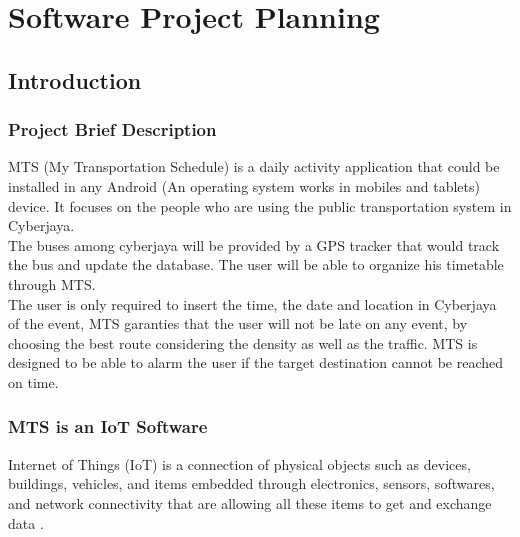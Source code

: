\chapter{Software Project Planning} 

\label{Chapter1} 


\doublespacing


\section{Introduction}

\subsection{Project Brief Description}
MTS (My Transportation Schedule) is a daily activity application that could be installed in any Android (An operating system works in mobiles and tablets) device. It focuses on the people who are using the public transportation system in Cyberjaya.\\

The buses among cyberjaya will be provided by a GPS tracker that would track the bus and update the database. The user will be able to organize his timetable through MTS.\\ 

The user is only required to insert the time, the date and location in Cyberjaya of the event, MTS garanties that the user will not be late on any event, by choosing the best route considering the density as well as the traffic. MTS is designed to be able to alarm the user if the target destination cannot be reached on time.

\subsection{MTS is an IoT Software}
Internet of Things (IoT) is a connection of physical objects such as devices, buildings, vehicles, and items embedded through electronics, sensors, softwares, and network connectivity that are allowing all these items to get and exchange data \cite{wikiIOT}.\\

